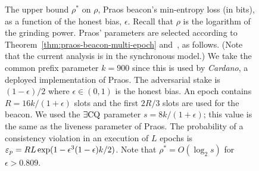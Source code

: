 

\begin{figure}[!htb]
    \centering
    \caption[Praos beacon]{
        The upper bound $\rho^*$ on $\rho$, 
        Praos beacon's min-entropy loss (in bits), 
        as a function of the honest bias, $\epsilon$. 
        Recall that $\rho$ is the logarithm of the grinding power.     
        Praos' parameters are selected according to Theorem~\ref{thm:praos-beacon-multi-epoch} 
        and~\citet[Theorem 9]{Praos}, as follows.
        (Note that the current analysis is in the synchronous model.)
        We take the common prefix parameter $k = 900$ since 
        this is used by \emph{Cardano}, a deployed implementation of Praos. 
        The adversarial stake is $(1-\epsilon)/2$ where $\epsilon \in (0,1)$ is the honest bias.
        An epoch contains $R = 16 k/(1+\epsilon)$ slots and the first $2R/3$ slots are used for the beacon. 
        We used the $\exists\mathrm{CQ}$ parameter $s = 8 k/(1+\epsilon)$; 
        this value is the same as the liveness parameter of Praos. 
        The probability of a consistency violation in an execution of $L$ epochs is 
        $\mathsf{\varepsilon}_p = R L \exp(1-\epsilon^3 (1-\epsilon)k/2) $. 
        Note that $\rho^* = O(\log_2 s)$ for $\epsilon > 0.809$.
    }
    \label{fig:rho-praos-beacon}
\end{figure}
